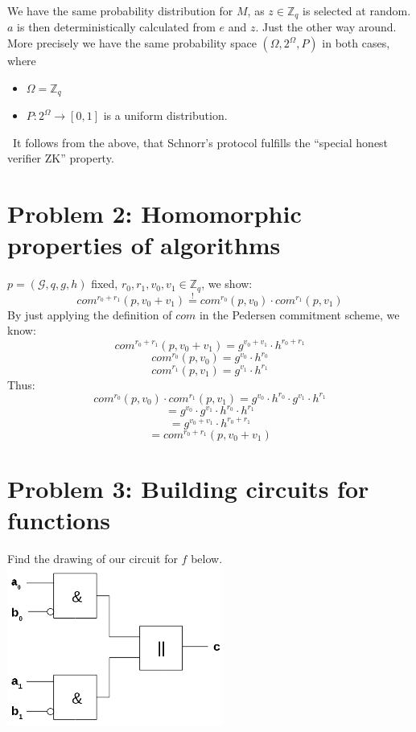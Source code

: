 \documentclass[12pt,pdftex,a4paper]{article}
\begin{document}
We have the same probability distribution for $M$, as $z\in \mathbb{Z}_q$ is selected at random. $a$ is then deterministically calculated from $e$ and $z$. Just the other way around.\\
More precisely we have the same probability space $(\Omega, 2^{\Omega}, P)$ in both cases, where
\begin{itemize}
\item $\Omega = \mathbb{Z}_q$
\item $P: 2^{\Omega} \rightarrow [0,1]$ is a uniform distribution.
\end{itemize}\
It follows from the above, that Schnorr's protocol fulfills the ``special honest verifier ZK'' property.

\section*{Problem 2: Homomorphic properties of algorithms}
$p=(\mathcal{G},q,g,h)$ fixed, $r_0, r_1, v_0, v_1 \in \mathbb{Z}_q$, we show:
$$com^{r_0+r_1}(p, v_0 + v_1) \overset{!}{=} com^{r_0}(p, v_0) \cdot com^{r_1}(p, v_1)$$
By just applying the definition of $com$ in the Pedersen commitment scheme, we know:
$$com^{r_0+r_1}(p, v_0 + v_1) = g^{v_0 + v_1}\cdot h^{r_0+r_1}$$
$$com^{r_0}(p, v_0) = g^{v_0} \cdot h^{r_0}$$
$$com^{r_1}(p, v_1) = g^{v_1} \cdot h^{r_1}$$
Thus:
$$com^{r_0}(p, v_0) \cdot com^{r_1}(p, v_1) = g^{v_0} \cdot h^{r_0} \cdot g^{v_1} \cdot h^{r_1}$$
$$= g^{v_0}\cdot g^{v_1}\cdot h^{r_0}\cdot h^{r_1}$$
$$= g^{v_0 + v_1}\cdot h^{r_0+r_1}$$
$$= com^{r_0+r_1}(p, v_0 + v_1)$$


\section*{Problem 3: Building circuits for functions}
Find the drawing of our circuit for $f$ below.\\
\includegraphics[width=200pt]{./problem3_binary_circuit.png}
\end{document}
